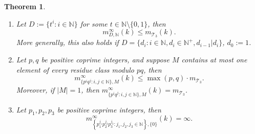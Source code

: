 \documentclass[10pt,a4paper]{amsart}
\newtheorem{theorem}{Theorem}
\newcommand{\N}{\mathbb{N}}
\begin{document}
\begin{theorem}\label{vegtelen_sorozat}

\begin{enumerate}
    \item 
    Let $D := \{t^i:i \in \mathbb{N}\}$ for some $t \in \mathbb{N} \setminus \{0,1\}$, then
    \[
    m_{D, \mathbb{N}}^{\infty}(k) \leq m_{\mathcal{T}_3}(k).
    \]
    More generally, this also holds if $D = \{d_i: i\in\N, d_i \in \mathbb{N}^+, d_{i-1} | d_{i}\}$, $d_0:=1$.
    \item 
    Let $p,q$ be positive coprime integers, and suppose $M$ contains at most one element of every residue class modulo $pq$, then
    \[
    m_{\{p^iq^j:i,j \in \mathbb{N}\}, M}^{\infty}(k) \leq \max(p,q)\cdot m_{\mathcal{T}_3}.
    \]
    Moreover, if $|M|=1$, then $m_{\{p^iq^j:i,j \in \mathbb{N}\}, M}^{\infty}(k) = m_{\mathcal{T}_3}$.
    \item 
    Let $p_1, p_2, p_3$ be positive coprime integers, then 
    \[
    m_{\left\{ p_1^{j_1}p_2^{j_2}p_3^{j_3}:j_1,j_2,j_3 \in \mathbb{N}\right\},\{0\}}^{\infty}(k) = \infty.
    \]

\end{enumerate}
\end{theorem}
\end{document}
